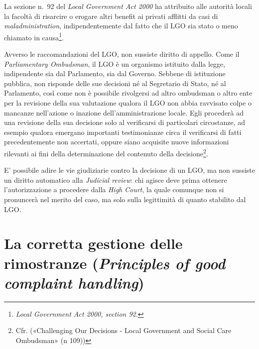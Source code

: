 \documentclass[12pt,it,a4paper,]{report}
\begin{document}
La sezione n.~92 del \emph{Local Government Act 2000} ha attribuito alle
autorità locali la facoltà di risarcire o erogare altri benefit ai
privati afflitti da casi di \emph{maladministration}, indipendentemente
dal fatto che il LGO sia stato o meno chiamato in causa\footnote{\emph{Local
  Government Act 2000, section 92}.}.

Avverso le raccomandazioni del LGO, non sussiste diritto di appello.
Come il \emph{Parliamentary Ombudsman}, il LGO è un organismo istituito
dalla legge, indipendente sia dal Parlamento, sia dal Governo. Sebbene
di istituzione pubblica, non risponde delle sue decisioni né al
Segretario di Stato, né al Parlamento, così come non è possibile
rivolgersi ad altro ombudsman o altro ente per la revisione della sua
valutazione qualora il LGO non abbia ravvisato colpe o mancanze
nell'azione o inazione dell'amministrazione locale. Egli procederà ad
una revisione della sua decisione solo al verificarsi di particolari
circostanze, ad esempio qualora emergano importanti testimonianze circa
il verificarsi di fatti precedentemente non accertati, oppure siano
acquisite nuove informazioni rilevanti ai fini della determinazione del
contenuto della decisione\footnote{Cfr. ({«Challenging Our Decisions -
  {Local Government} and {Social Care Ombudsman}»} (n 109))}.

E' possibile adire le vie giudiziarie contro la decisione di un LGO, ma
non sussiste un diritto automatico alla \emph{Judicial review}: chi
agisce deve prima ottenere l'autorizzazione a procedere dalla \emph{High
Court}, la quale comunque non si pronuncerà nel merito del caso, ma solo
sulla legittimità di quanto stabilito dal LGO.

\hypertarget{la-corretta-gestione-delle-rimostranze-principles-of-good-complaint-handling}{%
\section{\texorpdfstring{La corretta gestione delle rimostranze
(\emph{Principles of good complaint
handling})}{La corretta gestione delle rimostranze (Principles of good complaint handling)}}\label{la-corretta-gestione-delle-rimostranze-principles-of-good-complaint-handling}}
\end{document}
